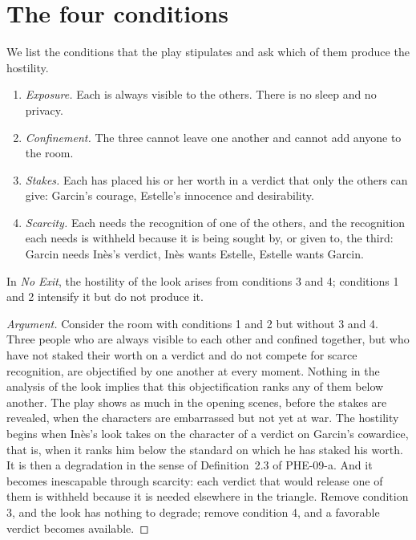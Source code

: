 \documentclass{situationist-preprint}
\begin{document}
\section{The four conditions}

We list the conditions that the play stipulates and ask which of them produce the hostility.

\begin{enumerate}
\item \emph{Exposure.} Each is always visible to the others. There is no sleep and no privacy.
\item \emph{Confinement.} The three cannot leave one another and cannot add anyone to the room.
\item \emph{Stakes.} Each has placed his or her worth in a verdict that only the others can give: Garcin's courage, Estelle's innocence and desirability.
\item \emph{Scarcity.} Each needs the recognition of one of the others, and the recognition each needs is withheld because it is being sought by, or given to, the third: Garcin needs Inès's verdict, Inès wants Estelle, Estelle wants Garcin.
\end{enumerate}

\begin{proposition}\label{p:conditions}
In \emph{No Exit}, the hostility of the look arises from conditions 3 and 4; conditions 1 and 2 intensify it but do not produce it.
\end{proposition}

\begin{proof}[Argument]
Consider the room with conditions 1 and 2 but without 3 and 4. Three people who are always visible to each other and confined together, but who have not staked their worth on a verdict and do not compete for scarce recognition, are objectified by one another at every moment. Nothing in the analysis of the look implies that this objectification ranks any of them below another. The play shows as much in the opening scenes, before the stakes are revealed, when the characters are embarrassed but not yet at war. The hostility begins when Inès's look takes on the character of a verdict on Garcin's cowardice, that is, when it ranks him below the standard on which he has staked his worth. It is then a degradation in the sense of Definition~2.3 of PHE-09-a. And it becomes inescapable through scarcity: each verdict that would release one of them is withheld because it is needed elsewhere in the triangle. Remove condition 3, and the look has nothing to degrade; remove condition 4, and a favorable verdict becomes available.
\end{proof}
\end{document}
